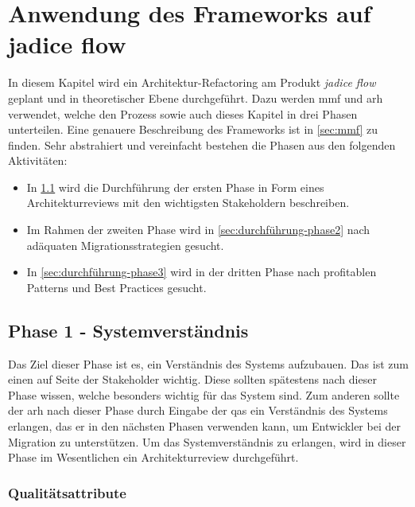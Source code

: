 \chapter{Anwendung des Frameworks auf jadice flow}
\label{chap:anwendung}

In diesem Kapitel wird ein Architektur-Refactoring am Produkt \emph{jadice flow} geplant und in theoretischer Ebene durchgeführt.
Dazu werden \acrfull{mmf} und \acrfull{arh} verwendet, welche den Prozess sowie auch dieses Kapitel in drei Phasen unterteilen.
Eine genauere Beschreibung des Frameworks ist in \cref{sec:mmf} zu finden.
Sehr abstrahiert und vereinfacht bestehen die Phasen aus den folgenden Aktivitäten:
\begin{itemize}
	\item In \cref{sec:durchführung-phase1} wird die Durchführung der ersten Phase in Form eines Architekturreviews mit den wichtigsten Stakeholdern beschreiben.
	\item Im Rahmen der zweiten Phase wird in \cref{sec:durchführung-phase2} nach adäquaten Migrationsstrategien gesucht.
	\item In \cref{sec:durchführung-phase3} wird in der dritten Phase nach profitablen Patterns und Best Practices gesucht.
\end{itemize}

\section{Phase 1 - Systemverständnis}
\label{sec:durchführung-phase1}

Das Ziel dieser Phase ist es, ein Verständnis des Systems aufzubauen.
Das ist zum einen auf Seite der Stakeholder wichtig.
Diese sollten spätestens nach dieser Phase wissen, welche  besonders wichtig für das System sind.
Zum anderen sollte der \gls{arh} nach dieser Phase durch Eingabe der \glspl{qa} ein Verständnis des Systems erlangen, das er in den nächsten Phasen verwenden kann, um Entwickler bei der Migration zu unterstützen.
Um das Systemverständnis zu erlangen, wird in dieser Phase im Wesentlichen ein Architekturreview durchgeführt. 

\subsection{Qualitätsattribute}


